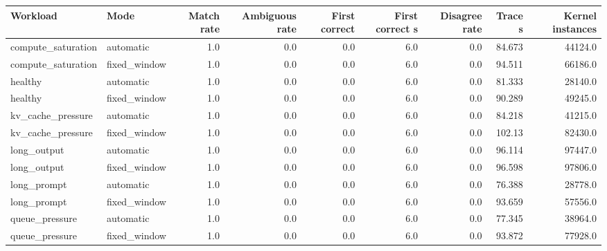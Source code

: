 \begin{tabular}{llrrrrrrr}
\hline
Workload & Mode & Match rate & Ambiguous rate & First correct & First correct s & Disagree rate & Trace s & Kernel instances \\
\hline
compute_saturation & automatic & 1.0 & 0.0 & 0.0 & 6.0 & 0.0 & 84.673 & 44124.0 \\
compute_saturation & fixed_window & 1.0 & 0.0 & 0.0 & 6.0 & 0.0 & 94.511 & 66186.0 \\
healthy & automatic & 1.0 & 0.0 & 0.0 & 6.0 & 0.0 & 81.333 & 28140.0 \\
healthy & fixed_window & 1.0 & 0.0 & 0.0 & 6.0 & 0.0 & 90.289 & 49245.0 \\
kv_cache_pressure & automatic & 1.0 & 0.0 & 0.0 & 6.0 & 0.0 & 84.218 & 41215.0 \\
kv_cache_pressure & fixed_window & 1.0 & 0.0 & 0.0 & 6.0 & 0.0 & 102.13 & 82430.0 \\
long_output & automatic & 1.0 & 0.0 & 0.0 & 6.0 & 0.0 & 96.114 & 97447.0 \\
long_output & fixed_window & 1.0 & 0.0 & 0.0 & 6.0 & 0.0 & 96.598 & 97806.0 \\
long_prompt & automatic & 1.0 & 0.0 & 0.0 & 6.0 & 0.0 & 76.388 & 28778.0 \\
long_prompt & fixed_window & 1.0 & 0.0 & 0.0 & 6.0 & 0.0 & 93.659 & 57556.0 \\
queue_pressure & automatic & 1.0 & 0.0 & 0.0 & 6.0 & 0.0 & 77.345 & 38964.0 \\
queue_pressure & fixed_window & 1.0 & 0.0 & 0.0 & 6.0 & 0.0 & 93.872 & 77928.0 \\
\hline
\end{tabular}
